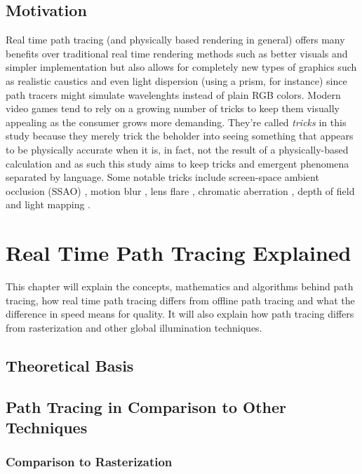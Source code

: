 \documentclass[
  twoside,
  11pt, a4paper,
  footinclude=true,
  headinclude=true,
  cleardoublepage=empty
]{scrreprt}
\begin{document}
\section{Motivation}
Real time path tracing (and physically based rendering in general) offers many
benefits over traditional real time rendering methods such as better visuals
and simpler implementation but also allows for completely new types of graphics
such as realistic caustics \cite{wiki:caustics} and even light dispersion
\cite{wiki:dispersion} (using a prism, for instance) since path tracers might simulate wavelenghts
instead of plain RGB colors. Modern video games tend
to rely on a growing number of tricks to keep them visually appealing as the
consumer grows more demanding. They're called \textit{tricks} in this study
because they merely trick the beholder into seeing something that appears to be
physically accurate when it is, in fact, not the result of a physically-based
calculation and as such this study aims to keep tricks and emergent phenomena
separated by language. Some notable tricks include screen-space ambient occlusion (SSAO)
\cite{wiki:ssao}, motion blur \cite{wiki:motion-blur}, lens flare
\cite{wiki:lens-flare}, chromatic aberration \cite{wiki:chromatic-aberration},
depth of field \cite{wiki:depth-of-field} and light mapping \cite{wiki:lightmap}.

\chapter{Real Time Path Tracing Explained}
This chapter will explain the concepts, mathematics and algorithms behind path tracing, how real
time path tracing differs from offline path tracing and what the difference in speed means for
quality. It will also explain how path tracing differs from rasterization and other global
illumination techniques.

\section{Theoretical Basis}
\lipsum[1]

\section{Path Tracing in Comparison to Other Techniques}

\subsection{Comparison to Rasterization}
\end{document}
